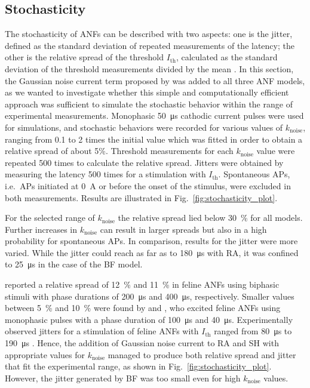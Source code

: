 \documentclass[utf8]{frontiersSCNS} %
\newcommand{\T}[1]{\text{#1}}
\begin{document}
\subsection{Stochasticity}
\label{subsec:stochastic properties}
The stochasticity of ANFs can be described with two aspects: one is the jitter, defined as the standard deviation of repeated measurements of the latency; the other is the relative spread of the threshold $I_{\T{th}}$, calculated as the standard deviation of the threshold measurements divided by the mean \citep{VanGendt2016}. %
In this section, the Gaussian noise current term proposed by \cite{Rattay2001} was added to all three ANF models, as we wanted to investigate whether this simple and computationally efficient approach was sufficient to simulate the stochastic behavior within the range of experimental measurements.
Monophasic \SI{50}{\micro\second} cathodic current pulses were used for simulations, and stochastic behaviors were recorded for various values of $k_{\T{noise}}$, ranging from 0.1 to 2 times the initial value which was fitted in order to obtain a relative spread of about 5\%. Threshold measurements for each $k_{\T{noise}}$ value were repeated 500 times to calculate the relative spread. Jitters were obtained by measuring the latency 500 times for a stimulation with $I_{\T{th}}$. Spontaneous APs, i.e.\ APs initiated at \SI{0}{\ampere} or before the onset of the stimulus, were excluded in both measurements. Results are illustrated in Fig.\  \ref{fig:stochasticity_plot}.

For the selected range of $k_{\T{noise}}$ the relative spread lied below \SI{30}{\percent} for all models. Further increases in $k_{\T{noise}}$ can result in larger spreads but also in a high probability for spontaneous APs.
In comparison, results for the jitter were more varied. While the jitter could reach as far as to \SI{180}{\micro\second} with RA, it was confined to \SI{25}{\micro\second} in the case of the BF model.

\cite{Javel1987} reported a relative spread of \SI{12}{\percent} and \SI{11}{\percent} in feline ANFs using biphasic stimuli with phase durations of \SI{200}{\micro\second} and \SI{400}{\micro\second}, respectively. Smaller values between \SI{5}{\percent} and \SI{10}{\percent} were found by \cite{Miller1999} and \cite{Dynes1996}, who excited feline ANFs using monophasic pulses with a phase duration of \SI{100}{\micro\second} and \SI{40}{\micro\second}. Experimentally observed jitters for a stimulation of feline ANFs with $I_{\T{th}}$ ranged from \SI{80}{\micro\second} \citep{Cartee2000} to \SI{190}{\micro\second} \citep{VandenHonert1984}.
Hence, the addition of Gaussian noise current to RA and SH with appropriate values for $k_{\T{noise}}$ managed to produce both relative spread and jitter that fit the experimental range, as shown in Fig.\ \ref{fig:stochasticity_plot}. However, the jitter generated by BF was too small even for high $k_{\T{noise}}$ values.
\end{document}
